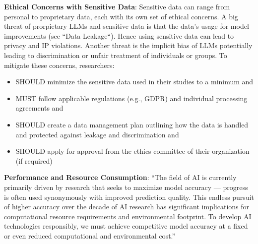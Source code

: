 \textbf{Ethical Concerns with Sensitive Data}:
Sensitive data can range from personal to proprietary data, each with its own set of ethical concerns. A big threat of prorpietary LLMs and sensitive data is that the data's usage for model improvements (see ``Data Leakage``). Hence using sensitive data can lead to privacy and IP violations.
Another threat is the implicit bias of LLMs potentially leading to discrimination or unfair treatment of individuals or groups.
To mitigate these concerns, researchers:
\begin{itemize}
  \item SHOULD minimize the sensitive data used in their studies to a minimum and
  \item MUST follow applicable regulations (e.g., GDPR) and individual processing agreements and
  \item SHOULD create a data management plan outlining how the data is handled and protected against leakage and discrimination and
  \item SHOULD apply for approval from the ethics committee of their organization (if required)
\end{itemize}

\textbf{Performance and Resource Consumption}:
\enquote{The field of AI is currently primarily driven by research that seeks to maximize model accuracy — progress is often used synonymously with improved prediction quality. This endless pursuit of higher accuracy over the decade of AI research has significant implications for computational resource requirements and environmental footprint. To develop AI technologies responsibly, we must achieve competitive model accuracy at a fixed or even reduced computational and environmental cost.} ~\cite{DBLP:conf/mlsys/WuRGAAMCBHBGGOM22}

